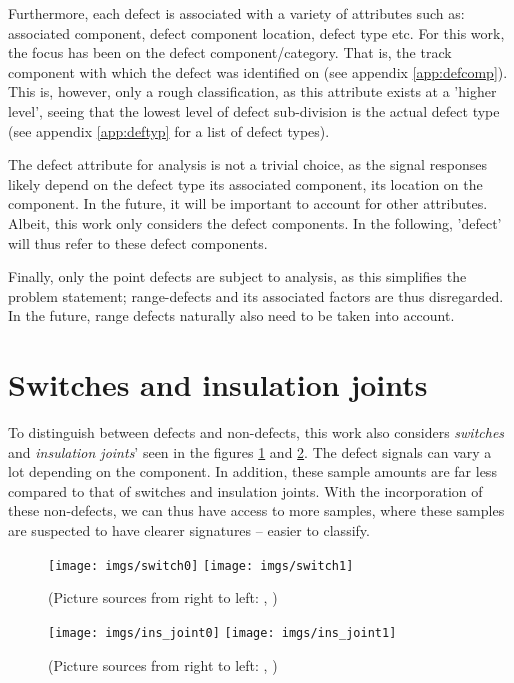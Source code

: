 \raggedbottom %
Furthermore, each defect is associated with a variety of attributes such as: associated component, defect component location, defect type etc. For this work, the focus has been on the defect component/category. That is, the track component with which the defect was identified on (see appendix \ref{app:defcomp}). This is, however, only a rough classification, as this attribute exists at a 'higher level', seeing that the lowest level of defect sub-division is the actual defect type (see appendix \ref{app:deftyp} for a list of defect types).

The defect attribute for analysis is not a trivial choice, as the signal responses likely depend on the defect type its associated component, its location on the component. In the future, it will be important to account for other attributes. Albeit, this work only considers the defect components. In the following, 'defect' will thus refer to these defect components.

Finally, only the point defects are subject to analysis, as this simplifies the problem statement; range-defects and its associated factors are thus disregarded. In the future, range defects naturally also need to be taken into account.

\section{Switches and insulation joints}
To distinguish between defects and non-defects, this work also considers \textit{switches} and \textit{insulation joints}' seen in the figures \ref{fig:swi} and \ref{fig:ins}. The defect signals can vary a lot depending on the component. In addition, these sample amounts are far less compared to that of switches and insulation joints. With the incorporation of these non-defects,  we can thus have access to more samples, where these samples are suspected to have clearer signatures -- easier to classify.

\begin{figure}[H]
	\centering
	\texttt{[image: imgs/switch0]}
	\texttt{[image: imgs/switch1]}
	\caption{(Picture sources from right to left: \cite{swi0:online}, \cite{swi1:online})}
	\label{fig:swi}
\end{figure}
\begin{figure}[H]
	\centering
	\texttt{[image: imgs/ins\_joint0]}
	\texttt{[image: imgs/ins\_joint1]}
	\caption{(Picture sources from right to left: \cite{ins0:online}, \cite{ins1:online})}
	\label{fig:ins}
\end{figure}


